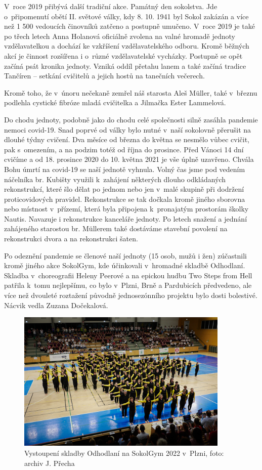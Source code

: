\documentclass[a5paper, 11pt, twoside]{article}
\begin{document}
V~roce 2019 přibývá další tradiční akce. Památný den sokolstva. Jde
o~připomenutí obětí II. světové války, kdy 8. 10. 1941 byl Sokol zakázán a
více než 1 500 vedoucích činovníků zatčeno a postupně umučeno. V~roce
2019 je také po třech letech Anna Holanová oficiálně zvolena na valné
hromadě jednoty vzdělavatelkou a dochází ke vzkříšení vzdělavatelského
odboru. Kromě běžných akcí je činnost rozšířena i o~různé vzdělavatelské
vycházky. Postupně se opět začíná psát kronika jednoty. Vzniká oddíl
přetahu lanem a také začíná tradice Tančíren -- setkání cvičitelů a
jejich hostů na tanečních večerech.

Kromě toho, že v~únoru nečekaně zemřel náš starosta Aleš Müller, také
v~březnu podlehla cystické fibróze mladá cvičitelka a Jilmačka Ester
Lammelová.

Do chodu jednoty, podobně jako do chodu celé společnosti silně zasáhla
pandemie nemoci covid-19. Snad poprvé od války bylo nutné v~naší
sokolovně přerušit na dlouhé týdny cvičení. Dva měsíce od března do
května se nesmělo vůbec cvičit, pak s~omezením, a na podzim totéž od
října do prosince. Před Vánoci 14 dní cvičíme a od 18. prosince 2020 do
10. května 2021 je vše úplně uzavřeno. Chvála Bohu úmrtí na covid-19 se
naší jednotě vyhnula. Volný čas jsme pod vedením náčelníka br. Kubišty
využili k~zahájení některých dlouho odkládaných rekonstrukcí, které šlo
dělat po jednom nebo jen v~malé skupině při dodržení proticovidových
pravidel. Rekonstrukce se tak dočkala kromě jiného sborovna nebo
místnost v~přízemí, která byla připojena k~pronajatým prostorám školky
Nautis. Navazuje i rekonstrukce kanceláře jednoty. Po letech snažení a
jednání zahájeného starostou br. Müllerem také dostáváme stavební
povolení na rekonstrukci dvora a na rekonstrukci šaten.

Po odeznění pandemie se členové naší jednoty (15 osob, mužů i žen)
zúčastnili kromě jiného akce SokolGym, kde účinkovali v~hromadné skladbě
Odhodlaní. Skladba v~choreografii Heleny Peerové a na epickou hudbu Two
Steps from Hell patřila k~tomu nejlepšímu, co bylo v~Plzni, Brně a
Pardubicích předvedeno, ale více než dvouleté roztažení původně
jednosezónního projektu bylo dosti bolestivé. Nácvik vedla Zuzana
Dočekalová.

\begin{figure}[h]
  \centering 
  \includegraphics[width=0.9\textwidth]{img/66_odhodlani.jpg}
  \caption*{Vystoupení skladby Odhodlaní na SokolGym 2022 v~Plzni, foto:
  archiv J. Přecha}
\end{figure}
\end{document}
